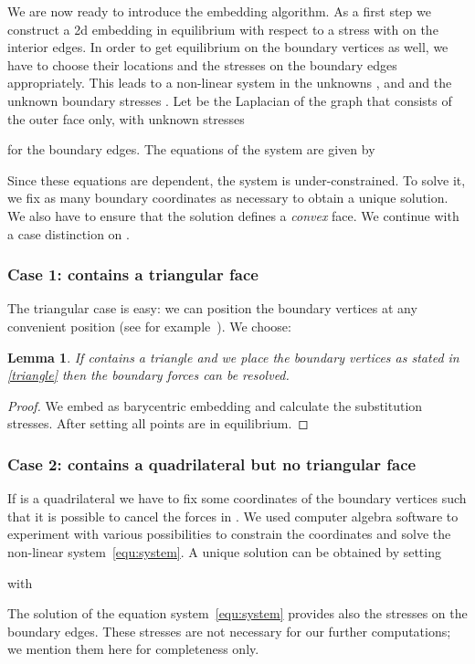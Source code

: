 \documentclass{article}
\theoremstyle{plain} \newtheorem{thm}{Theorem}[section]
\newtheorem{lem}{Lemma}[section]
\begin{document}
We are now ready to introduce the embedding algorithm. 
As a first step we construct a 2d
embedding in equilibrium with respect to a stress  with  on the interior edges.
In order to get equilibrium on the boundary vertices as well,
we have to choose their locations and the stresses on the boundary edges appropriately.
This leads to a
non-linear system in the  unknowns , and  and the 
unknown boundary stresses .
Let  be the Laplacian of the graph that consists of the outer face  only, with unknown stresses
 
for the boundary edges. The  equations of the system are given by 

Since these equations are dependent, the system is
under-constrained. To solve it, we fix as many boundary coordinates as
necessary to obtain a unique solution.  We also have to ensure that the
solution defines a \emph{convex} face. We continue with a case
distinction on .

\subsubsection*{Case 1:  contains a triangular face}\label{sec:case1}
The triangular case is easy: we can position the boundary  vertices at any
convenient position (see for example~\cite{hk-prga-92}). We choose:

\begin{lem}
If  contains a triangle and we place the boundary
vertices as
stated in \eqref{triangle} then the boundary forces can be resolved.
\end{lem}
\begin{proof}
We embed  as barycentric embedding and calculate the substitution
stresses. 
After setting 
all points are in equilibrium. 
\end{proof}

\subsubsection*{Case 2:  contains a quadrilateral but no triangular face}\label{sec:case2}
If  is a quadrilateral we have to fix some 
coordinates of the boundary vertices such that
it is possible to cancel the forces in . 
We used computer algebra software to experiment with various
possibilities to constrain the coordinates and solve the non-linear
system~\eqref{equ:system}.
A unique solution can be obtained by setting 

with

The solution of the equation system~\eqref{equ:system} provides also the stresses on the boundary edges. These stresses are not necessary for our further computations; we mention them here for completeness only.
\end{document}
